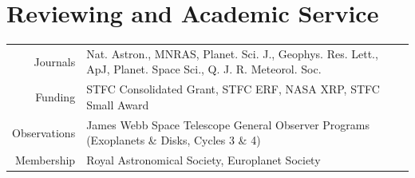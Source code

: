 \documentclass[a4paper, 11pt]{article}
\begin{document}
\section{Reviewing and Academic Service}
\begin{tabularx}{\linewidth}{@{}r X@{}}
Journals & Nat. Astron., MNRAS, Planet. Sci. J., Geophys. Res. Lett., ApJ, Planet. Space Sci., Q. J. R. Meteorol. Soc.\\
Funding  & STFC Consolidated Grant, STFC ERF, NASA XRP, STFC Small Award \\
Observations & James Webb Space Telescope General Observer Programs (Exoplanets \& Disks, Cycles 3 \& 4)\\
Membership & Royal Astronomical Society, Europlanet Society\\
\end{tabularx}
\end{document}

